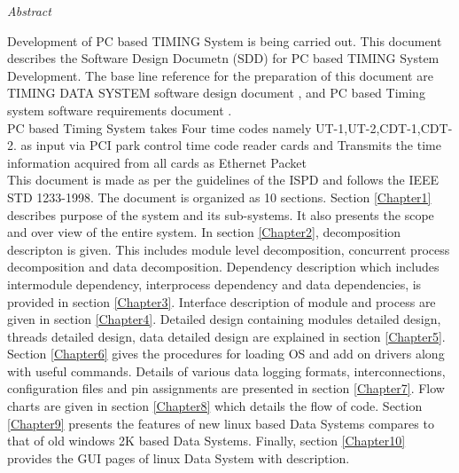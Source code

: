 \documentclass[a4paper, 12pt, oneside]{Thesis}  %
\begin{document}
\pagestyle{fancy}  %


\clearpage  %



\begin{center}
\LARGE\textit{Abstract}
\end{center}
\vspace{-3 mm}
\begin{spacing}{1.3}

Development of PC based TIMING System is being carried out. This document describes the Software Design Documetn (SDD) for  PC based TIMING  System Development. The base line reference for the preparation of this document are TIMING DATA SYSTEM software design document \cite{TCOldSWDoc}, and PC based Timing system software requirements document \cite{SRSLBDPS}. \\

PC based Timing  System takes Four time codes namely  UT-1,UT-2,CDT-1,CDT-2. as input via PCI park control time code reader cards and Transmits the time information acquired from all cards as Ethernet Packet\\

This document is made as per the guidelines of the ISPD and follows the IEEE STD 1233-1998. The document is organized as 10 sections. Section \ref{Chapter1} describes purpose of the system and its sub-systems. It also presents the scope and over view of the entire system. In section \ref{Chapter2}, decomposition descripton is given. This includes module level decomposition, concurrent process decomposition and data decomposition. Dependency description which includes intermodule dependency, interprocess dependency and data dependencies, is provided in section \ref{Chapter3}. Interface description  of module and process are given in section \ref{Chapter4}. Detailed design containing modules detailed design, threads detailed design, data detailed design are explained in section \ref{Chapter5}. Section \ref{Chapter6} gives the procedures for loading OS and add on drivers along with useful commands. Details of various data logging formats, interconnections, configuration files and pin assignments are presented in section \ref{Chapter7}. Flow charts are given in section \ref{Chapter8} which details the flow of code. Section \ref{Chapter9} presents the features of new linux based Data Systems compares to that of old windows 2K based Data Systems. Finally, section \ref{Chapter10} provides the GUI pages  of linux Data System with description.



\end{spacing}
\end{document}
